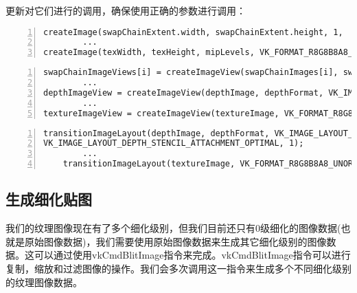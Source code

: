 \documentclass{ctexart}
\begin{document}
更新对它们进行的调用，确保使用正确的参数进行调用：

\begin{lstlisting}[language={[ANSI]C},keywordstyle=\color{blue!70},commentstyle=\color{red!50!green!50!blue!50},frame=shadowbox, rulesepcolor=\color{red!20!green!20!blue!20},basicstyle=\small,numbers=left, numberstyle=\tiny,breaklines=true]
createImage(swapChainExtent.width, swapChainExtent.height, 1,  depthFormat, VK_IMAGE_TILING_OPTIMAL, VK_IMAGE_USAGE_DEPTH_STENCIL_ATTACHMENT_BIT, VK_MEMORY_PROPERTY_DEVICE_LOCAL_BIT, depthImage, depthImageMemory);
		...
createImage(texWidth, texHeight, mipLevels, VK_FORMAT_R8G8B8A8_UNORM, VK_IMAGE_TILING_OPTIMAL, VK_IMAGE_USAGE_TRANSFER_DST_BIT | VK_IMAGE_USAGE_SAMPLED_BIT, VK_MEMORY_PROPERTY_DEVICE_LOCAL_BIT, textureImage, textureImageMemory);
\end{lstlisting}

\begin{lstlisting}[language={[ANSI]C},keywordstyle=\color{blue!70},commentstyle=\color{red!50!green!50!blue!50},frame=shadowbox, rulesepcolor=\color{red!20!green!20!blue!20},basicstyle=\small,numbers=left, numberstyle=\tiny,breaklines=true]
swapChainImageViews[i] = createImageView(swapChainImages[i], swapChainImageFormat, VK_IMAGE_ASPECT_COLOR_BIT, 1);
		...
depthImageView = createImageView(depthImage, depthFormat, VK_IMAGE_ASPECT_DEPTH_BIT, 1);
		...
textureImageView = createImageView(textureImage, VK_FORMAT_R8G8B8A8_UNORM, VK_IMAGE_ASPECT_COLOR_BIT, mipLevels);
\end{lstlisting}

\begin{lstlisting}[language={[ANSI]C},keywordstyle=\color{blue!70},commentstyle=\color{red!50!green!50!blue!50},frame=shadowbox, rulesepcolor=\color{red!20!green!20!blue!20},basicstyle=\small,numbers=left, numberstyle=\tiny,breaklines=true]
transitionImageLayout(depthImage, depthFormat, VK_IMAGE_LAYOUT_UNDEFINED,
VK_IMAGE_LAYOUT_DEPTH_STENCIL_ATTACHMENT_OPTIMAL, 1);
		...
	transitionImageLayout(textureImage, VK_FORMAT_R8G8B8A8_UNORM, VK_IMAGE_LAYOUT_UNDEFINED, VK_IMAGE_LAYOUT_TRANSFER_DST_OPTIMAL, mipLevels);
\end{lstlisting}

\subsection{生成细化贴图}

我们的纹理图像现在有了多个细化级别，但我们目前还只有0级细化的图像数据(也就是原始图像数据)，我们需要使用原始图像数据来生成其它细化级别的图像数据。这可以通过使用vkCmdBlitImage指令来完成。vkCmdBlitImage指令可以进行复制，缩放和过滤图像的操作。我们会多次调用这一指令来生成多个不同细化级别的纹理图像数据。
\end{document}
